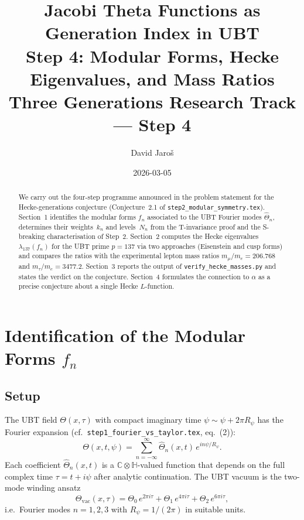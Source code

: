 \documentclass[12pt,a4paper]{article}
\title{%
  Jacobi Theta Functions as Generation Index in UBT\\
  Step 4: Modular Forms, Hecke Eigenvalues, and Mass Ratios\\
  \large Three Generations Research Track --- Step 4
}
\author{David Jaro\v{s}}
\date{2026-03-05}
\theoremstyle{remark}
\newcommand{\C}{\mathbb{C}}
\begin{document}
\maketitle

\begin{abstract}
We carry out the four-step programme announced in the problem statement for
the Hecke-generations conjecture
(Conjecture~2.1 of \texttt{step2\_modular\_symmetry.tex}).
Section~1 identifies the modular forms $f_n$ associated to the UBT Fourier
modes $\hat\Theta_n$, determines their weights~$k_n$ and levels~$N_n$ from
the T-invariance proof and the S-breaking characterisation of Step~2.
Section~2 computes the Hecke eigenvalues $\lambda_{137}(f_n)$ for
the UBT prime $p=137$ via two approaches (Eisenstein and cusp forms) and
compares the ratios with the experimental lepton mass ratios
$m_\mu/m_e = 206.768$ and $m_\tau/m_e = 3477.2$.
Section~3 reports the output of \texttt{verify\_hecke\_masses.py}
and states the verdict on the conjecture.
Section~4 formulates the connection to $\alpha$ as a precise conjecture
about a single Hecke $L$-function.
\end{abstract}

\tableofcontents

\section{Identification of the Modular Forms $f_n$}
\label{sec:modular_forms}

\subsection{Setup}

The UBT field $\Theta(x,\tau)$ with compact imaginary time $\psi\sim\psi+2\pi R_\psi$
has the Fourier expansion (cf.\ \texttt{step1\_fourier\_vs\_taylor.tex}, eq.~(2)):
\begin{equation}
  \label{eq:fourier}
  \Theta(x,t,\psi)
  = \sum_{n=-\infty}^{\infty}
    \hat\Theta_n(x,t)\,e^{in\psi/R_\psi}.
\end{equation}
Each coefficient $\hat\Theta_n(x,t)$ is a $\C\otimes\mathbb{H}$-valued function
that depends on the full complex time $\tau = t+i\psi$ after analytic continuation.
The UBT vacuum is the two-mode winding ansatz
\begin{equation}
  \label{eq:vacuum_ansatz}
  \Theta_{\mathrm{vac}}(x,\tau)
  = \Theta_0\,e^{2\pi i\tau} + \Theta_1\,e^{4\pi i\tau} + \Theta_2\,e^{6\pi i\tau},
\end{equation}
i.e.\ Fourier modes $n=1,2,3$ with $R_\psi = 1/(2\pi)$ in suitable units.
\end{document}
